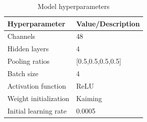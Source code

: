 \begin{table}[ht]
    \centering
    \caption{Model hyperparameters}
    \label{table:hp}
    \begin{tabular}{|l|l|}
    \hline
    \textbf{Hyperparameter}    & \textbf{Value/Description} \\
    \hline
    Channels    & 48                           \\
    \hline
    Hidden layers    & 4                          \\
    \hline
    Pooling ratios             & [0.5,0.5,0.5,0.5]                       \\
    \hline
    Batch size                 & 4                         \\
    \hline
    Activation function        & ReLU                       \\
    \hline
    Weight initialization    &  Kaiming                        \\
    \hline
    Initial learning rate       & 0.0005                       \\
    \hline
    \end{tabular}
    \end{table}
